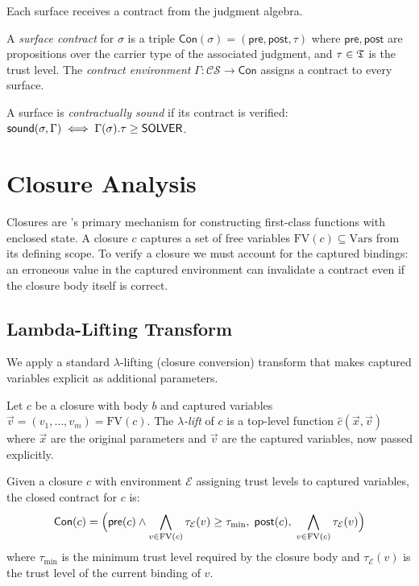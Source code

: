 \documentclass[11pt]{article}
\newcommand{\CS}{\mathcal{CS}}                 %
\newcommand{\surf}{\sigma}                     %
\newcommand{\CEnv}{\Gamma}                     %
\newcommand{\FV}{\mathrm{FV}}                  %
\newcommand{\Env}{\mathcal{E}}                 %
\newcommand{\Contract}{\mathsf{Con}}           %
\newcommand{\Pre}{\mathsf{pre}}                %
\newcommand{\Post}{\mathsf{post}}              %
\newcommand{\sound}{\mathsf{sound}}            %
\begin{document}
Each surface receives a contract from the judgment algebra.

\begin{definition}\label{def:contract}
A \emph{surface contract} for $\surf$ is a triple
$\Contract(\surf) = (\Pre, \Post, \tau)$ where
$\Pre, \Post$ are propositions over the carrier type of the
associated judgment, and $\tau \in \mathfrak{T}$ is the trust level.
The \emph{contract environment} $\CEnv : \CS \to \Contract$
assigns a contract to every surface.
\end{definition}

A surface is \emph{contractually sound} if its contract is verified:
$\sound(\surf, \CEnv) \iff \CEnv(\surf).\tau \ge \Tsolver$.

\section{Closure Analysis}\label{sec:closure}

Closures are \Python's primary mechanism for constructing first-class
functions with enclosed state.  A closure $c$ captures a set of
free variables $\FV(c) \subseteq \mathrm{Vars}$ from its defining
scope.  To verify a closure we must account for the captured
bindings: an erroneous value in the captured environment can
invalidate a contract even if the closure body itself is correct.

\subsection{Lambda-Lifting Transform}

We apply a standard $\lambda$-lifting (closure conversion) transform
that makes captured variables explicit as additional parameters.

\begin{definition}\label{def:lambdalift}
Let $c$ be a closure with body $b$ and captured variables
$\vec{v} = (v_1,\dots,v_m) = \FV(c)$.
The \emph{$\lambda$-lift} of $c$ is a top-level function
$\hat{c}(\vec{x}, \vec{v})$ where $\vec{x}$ are the original
parameters and $\vec{v}$ are the captured variables, now passed
explicitly.
\end{definition}

\begin{construction}\label{const:closcon}
Given a closure $c$ with environment $\Env$ assigning trust levels to
captured variables, the closed contract for $c$ is:
\[
  \Contract(c) = \Bigl(\Pre(c) \wedge \bigwedge_{v \in \FV(c)} \tau_\Env(v) \ge \tau_{\min},\;
                       \Post(c),\;
                       \bigwedge_{v \in \FV(c)} \tau_\Env(v) \Bigr)
\]
where $\tau_{\min}$ is the minimum trust level required by the closure
body and $\tau_\Env(v)$ is the trust level of the current binding of $v$.
\end{construction}
\end{document}
